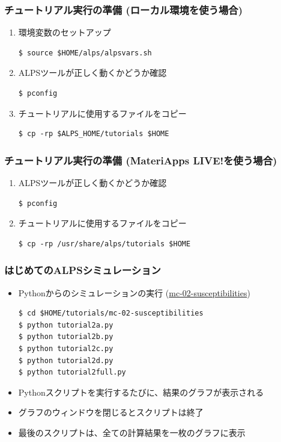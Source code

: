 \begin{frame}[t,fragile]
  \frametitle{チュートリアル実行の準備 (ローカル環境を使う場合)}
  \begin{enumerate}
  \item 環境変数のセットアップ
\begin{lstlisting}
$ source $HOME/alps/alpsvars.sh
\end{lstlisting}
  \item ALPSツールが正しく動くかどうか確認
\begin{lstlisting}
$ pconfig
\end{lstlisting}
  \item チュートリアルに使用するファイルをコピー
\begin{lstlisting}
$ cp -rp $ALPS_HOME/tutorials $HOME
\end{lstlisting}
  \end{enumerate}
\end{frame}

\begin{frame}[t,fragile]
  \frametitle{チュートリアル実行の準備 (MateriApps LIVE!を使う場合)}
  \begin{enumerate}
  \item ALPSツールが正しく動くかどうか確認
\begin{lstlisting}
$ pconfig
\end{lstlisting}
  \item チュートリアルに使用するファイルをコピー
\begin{lstlisting}
$ cp -rp /usr/share/alps/tutorials $HOME
\end{lstlisting}
  \end{enumerate}
\end{frame}

\begin{frame}[t,fragile]
  \frametitle{はじめてのALPSシミュレーション}
  \begin{itemize}
    \item Pythonからのシミュレーションの実行 (\href{http://alps.comp-phys.org/mediawiki/index.php/ALPS_2_Tutorials:MC-02_Susceptibilities}{mc-02-susceptibilities})
\begin{lstlisting}
$ cd $HOME/tutorials/mc-02-susceptibilities
$ python tutorial2a.py
$ python tutorial2b.py
$ python tutorial2c.py
$ python tutorial2d.py
$ python tutorial2full.py
\end{lstlisting}
    \item Pythonスクリプトを実行するたびに、結果のグラフが表示される
    \item グラフのウィンドウを閉じるとスクリプトは終了
    \item 最後のスクリプトは、全ての計算結果を一枚のグラフに表示
  \end{itemize}
\end{frame}

